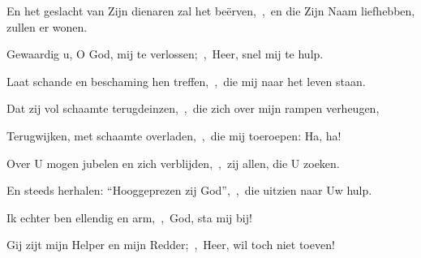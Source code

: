 \documentclass[12pt,twoside,a5paper]{article}
\begin{document}
\begin{halfparskip}
  En het geslacht van Zijn dienaren zal het beërven,~\sep\ en die Zijn Naam liefhebben, zullen er wonen.

   Gewaardig u, O God, mij te verlossen;~\sep\ Heer, snel mij te hulp.

  Laat schande en beschaming hen treffen,~\sep\ die mij naar het leven staan.

  Dat zij vol schaamte terugdeinzen,~\sep\ die zich over mijn rampen verheugen,

  Terugwijken, met schaamte overladen,~\sep\ die mij toeroepen: Ha, ha!

  Over U mogen jubelen en zich verblijden,~\sep\ zij allen, die U zoeken.

  En steeds herhalen: ``Hooggeprezen zij God'',~\sep\ die uitzien naar Uw hulp.

  Ik echter ben ellendig en arm,~\sep\ God, sta mij bij!

  Gij zijt mijn Helper en mijn Redder;~\sep\ Heer, wil toch niet toeven!
\end{halfparskip}

\end{document}
